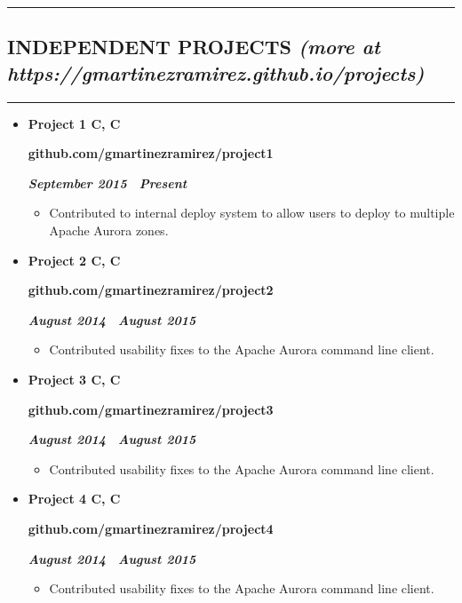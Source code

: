 \documentclass[10pt,letterpaper]{article}
\newcommand{\textbox}[1]{
  \parbox{.333\textwidth}{#1}
}
\newcommand{\CPP}
{C\nolinebreak[4]\hspace{-.05em}\raisebox{.22ex}{\footnotesize\bf ++}}
\newcommand{\sectionTitleWithWeb}[2]{
  \hrule
  \vspace{-1.0em} 
  \subsection*{\uppercase{\textbf{#1}} \hfill{\small \textit{(more at #2)}}}
  \vspace{-0.em}
  \hrule
  \vspace{0.3em}  
}
\newcommand{\titleExperienceWithoutLocation}[4]{
  \vspace{1.0em}
  \item[]
  {
    \textbox{\textbf{#1}\hfill}\textbox{\hfil \textbf{#2}\hfil}\hfill \textbf{\emph{#3 \textendash \ #4}}
  }
}
\begin{document}
  \sectionTitleWithWeb{Independent Projects}{https://gmartinezramirez.github.io/projects}
  \vspace{-0.9em}
  \begin{itemize}
    \parskip=-0.6em 
    \titleExperienceWithoutLocation{Project 1 \quad C, \CPP}{github.com/gmartinezramirez/project1}{September 2015}{Present}
      \begin{itemize}[label=\textbullet]
        \itemsep0em
        \item Contributed to internal deploy system to allow users to deploy to multiple Apache Aurora zones.
      \end{itemize}
  
    \vspace{-0.6em} 
    \titleExperienceWithoutLocation{Project 2 \quad C, \CPP}{github.com/gmartinezramirez/project2}{August 2014}{August 2015}
      \begin{itemize}[label=\textbullet]
        \itemsep0em
        \item Contributed usability fixes to the Apache Aurora command line client.
      \end{itemize}

    \vspace{-0.6em} 
    \titleExperienceWithoutLocation{Project 3 \quad C, \CPP}{github.com/gmartinezramirez/project3}{August 2014}{August 2015}
      \begin{itemize}[label=\textbullet]
        \itemsep0em
        \item Contributed usability fixes to the Apache Aurora command line client.
      \end{itemize}
    \vspace{-0.6em} 
    \titleExperienceWithoutLocation{Project 4 \quad C, \CPP}{github.com/gmartinezramirez/project4}{August 2014}{August 2015}
    \begin{itemize}[label=\textbullet]
      \itemsep0em
      \item Contributed usability fixes to the Apache Aurora command line client.
    \end{itemize}
  \end{itemize}
\end{document}

